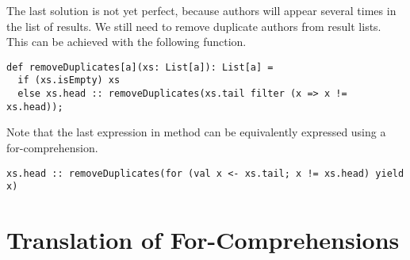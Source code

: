 \documentclass[a4paper,12pt,twoside,titlepage]{book}
\begin{document}
The last solution is not yet perfect, because authors will appear
several times in the list of results.  We still need to remove
duplicate authors from result lists.  This can be achieved with the
following function.
\begin{lstlisting}
def removeDuplicates[a](xs: List[a]): List[a] =
  if (xs.isEmpty) xs
  else xs.head :: removeDuplicates(xs.tail filter (x => x != xs.head));
\end{lstlisting}
Note that the last expression in method 
can be equivalently expressed using a for-comprehension.
\begin{lstlisting}
xs.head :: removeDuplicates(for (val x <- xs.tail; x != xs.head) yield x)
\end{lstlisting}

\section{Translation of For-Comprehensions}
\end{document}

